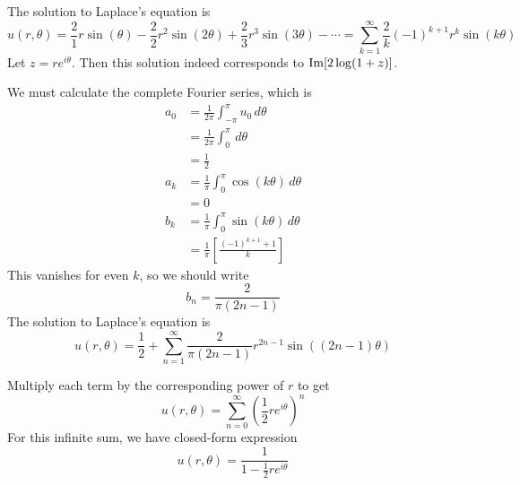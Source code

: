 \documentclass[a4paper]{article}
\begin{document}
The solution to Laplace's equation is
\[
	u\!\left( r, \theta \right) = \frac{2}{1}r \sin\!\left(\theta\right) - \frac{2}{2}r^{2}\sin\!\left(2 \theta\right) + \frac{2}{3}r^{3}\sin\!\left(3 \theta\right) - \cdots = \sum_{k = 1}^{\infty} \frac{2}{k}\!\left( -1 \right)^{k + 1}r^{k} \sin\!\left(k \theta\right)  
\]
Let \( z = re^{i \theta} \). Then this solution indeed corresponds to \( \operatorname{Im} \!\left[ 2 \log \!\left( 1 + z \right) \right] \).

\vspace{12pt}


We must calculate the complete Fourier series, which is
\begin{align*}
	a_{0} & = \frac{1}{2 \pi} \int^{\pi}_{-\pi} u_{0} \, d \theta \\
	 & = \frac{1}{2 \pi} \int^{\pi}_{0} \, d \theta \\ 
	 & = \frac{1}{2} \\
	a_{k} & = \frac{1}{\pi} \int^{\pi}_{0} \cos\!\left(k \theta\right) \, d \theta \\
	      & = 0 \\
	b_{k} & = \frac{1}{\pi} \int^{\pi}_{0} \sin\!\left(k \theta\right) \, d \theta \\
	      & = \frac{1}{\pi} \!\left[ \frac{\!\left( -1 \right)^{k + 1} + 1}{k} \right]
\end{align*}
This vanishes for even \( k \), so we should write
\[
	b_{n} = \frac{2}{\pi \!\left( 2n - 1 \right)} 
\]
The solution to Laplace's equation is
\[
	u \!\left( r, \theta \right) = \frac{1}{2} + \sum_{n = 1}^{\infty} \frac{2}{\pi \!\left( 2n - 1 \right)} r^{2n - 1} \sin\!\left(\!\left( 2n - 1 \right) \theta \right)
\]


Multiply each term by the corresponding power of \( r \) to get
\[
	u \!\left( r, \theta \right) = \sum_{n = 0}^{\infty} \!\left( \frac{1}{2}re^{i \theta} \right)^{n}
\]
For this infinite sum, we have closed-form expression
\[
	u \!\left( r, \theta \right) = \frac{1}{1 - \frac{1}{2}re^{i \theta}}
\]
\end{document}
